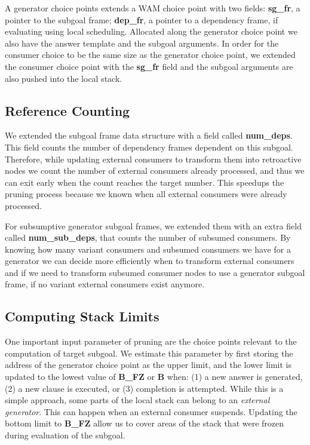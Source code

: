 A generator choice points extends a WAM choice point with two fields:
\textbf{sg\_fr}, a pointer to the subgoal frame; \textbf{dep\_fr}, a pointer to a dependency frame,
if evaluating using local scheduling. Allocated along the generator choice point we also have the answer
template and the subgoal arguments. In order for the consumer choice to be the same size as the
generator choice point, we extended the consumer choice point with the \textbf{sg\_fr} field and
the subgoal arguments are also pushed into the local stack.

\subsection{Reference Counting}

We extended the subgoal frame data structure with a field called \textbf{num\_deps}. This field
counts the number of dependency frames dependent on this subgoal. Therefore, while updating
external consumers to transform them into retroactive nodes we count the number of external consumers
already processed, and thus we can exit early when the count reaches the target number. This speedups
the pruning process because we known when all external consumers were already processed.

For subsumptive generator subgoal frames, we extended them with an extra field called \textbf{num\_sub\_deps}, that
counts the number of subsumed consumers. By knowing how many variant consumers and subsumed consumers we
have for a generator we can decide more efficiently when to transform external consumers and if we
need to transform subsumed consumer nodes to use a generator subgoal frame, if no variant external consumers
exist anymore.

\subsection{Computing Stack Limits}

One important input parameter of pruning are the choice points relevant to the
computation of target subgoal. We estimate this parameter by first storing the
address of the generator choice point as the upper limit, and the lower limit is
updated to the lowest value of \textbf{B\_FZ} or \textbf{B} when: (1) a new answer is
generated, (2) a new clause is executed, or (3) completion is attempted. While this
is a simple approach, some parts of the local stack can belong to an
\textit{external generator}. This can happen when an external consumer
suspends. Updating the bottom limit to \textbf{B\_FZ} allow us to cover areas of
the stack that were frozen during evaluation of the subgoal.

